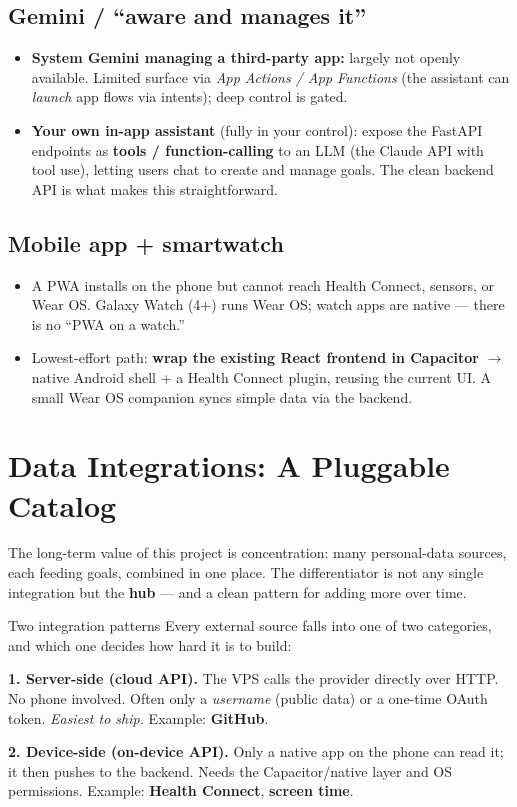 \documentclass[11pt,a4paper]{article}
\begin{document}
\subsection{Gemini / ``aware and manages it''}
\begin{itemize}
  \item \textbf{System Gemini managing a third-party app:} largely not openly
        available. Limited surface via \emph{App Actions / App Functions}
        (the assistant can \emph{launch} app flows via intents); deep control is gated.
  \item \textbf{Your own in-app assistant} (fully in your control): expose the
        FastAPI endpoints as \textbf{tools / function-calling} to an LLM
        (the Claude API with tool use), letting users chat to create and manage
        goals. The clean backend API is what makes this straightforward.
\end{itemize}

\subsection{Mobile app + smartwatch}
\begin{itemize}
  \item A PWA installs on the phone but cannot reach Health Connect, sensors, or
        Wear OS. Galaxy Watch (4+) runs Wear OS; watch apps are native --- there is
        no ``PWA on a watch.''
  \item Lowest-effort path: \textbf{wrap the existing React frontend in Capacitor}
        $\rightarrow$ native Android shell + a Health Connect plugin, reusing the
        current UI. A small Wear OS companion syncs simple data via the backend.
\end{itemize}

\section{Data Integrations: A Pluggable Catalog}

The long-term value of this project is concentration: many personal-data sources,
each feeding goals, combined in one place. The differentiator is not any single
integration but the \textbf{hub} --- and a clean pattern for adding more over time.

\begin{keybox}{Two integration patterns}
Every external source falls into one of two categories, and which one decides how
hard it is to build:

\medskip
\textbf{1. Server-side (cloud API).} The VPS calls the provider directly over HTTP.
No phone involved. Often only a \emph{username} (public data) or a one-time OAuth
token. \emph{Easiest to ship.} Example: \textbf{GitHub}.

\medskip
\textbf{2. Device-side (on-device API).} Only a native app on the phone can read it;
it then pushes to the backend. Needs the Capacitor/native layer and OS permissions.
Example: \textbf{Health Connect}, \textbf{screen time}.
\end{keybox}
\end{document}
